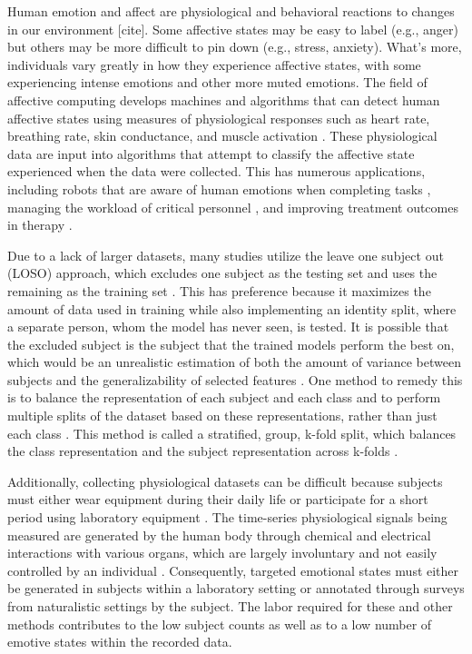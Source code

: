 \documentclass[12pt]{iopart}
\begin{document}
Human emotion and affect are physiological and behavioral reactions to changes in our environment [cite]. Some affective states may be easy to label (e.g., anger) but others may be more difficult to pin down (e.g., stress, anxiety). What's more, individuals vary greatly in how they experience affective states, with some experiencing intense emotions and other more muted emotions. The field of affective computing develops machines and algorithms that can detect human affective states using measures of physiological responses such as heart rate, breathing rate, skin conductance, and muscle activation \cite{picard2000affective}. These physiological data are input into algorithms that attempt to classify the affective state experienced when the data were collected.  This has numerous applications, including robots that are aware of human emotions when completing tasks \cite{gervasi2023applications}, managing the workload of critical personnel \cite{hosseini2022multimodal}, and improving treatment outcomes in therapy \cite{yannakakis2018enhancing}.  

Due to a lack of larger datasets, many studies utilize the leave one subject out (LOSO) approach, which excludes one subject as the testing set and uses the remaining as the training set \cite{schmidt2018introducing, farrahi2019evaluating}.  This has preference because it maximizes the amount of data used in training while also implementing an identity split, where a separate person, whom the model has never seen, is tested. It is possible that the excluded subject is the subject that the trained models perform the best on, which would be an unrealistic estimation of both the amount of variance between subjects and the generalizability of selected features \cite{mac2002problem, li2006reduction}.  One method to remedy this is to balance the representation of each subject and each class and to perform multiple splits of the dataset based on these representations, rather than just each class \cite{li2006reduction}.  This method is called a stratified, group, k-fold split, which balances the class representation and the subject representation across k-folds \cite{pedregosa2011scikit}.  

Additionally, collecting physiological datasets can be difficult because subjects must either wear equipment during their daily life or participate for a short period using laboratory equipment \cite{gjoreski2020datasets, spathis2020learning, schmidt2018introducing, goodwin2019predicting, thayer2022effects, hosseini2022multimodal, poh2010wearable, ekiz2020can}.  The time-series physiological signals being measured are generated by the human body through chemical and electrical interactions with various organs, which are largely involuntary and not easily controlled by an individual \cite{goodwin2019predicting}.  Consequently, targeted emotional states must either be generated in subjects within a laboratory setting or annotated through surveys from naturalistic settings by the subject.  The labor required for these and other methods contributes to the low subject counts as well as to a low number of emotive states within the recorded data.  
\end{document}
